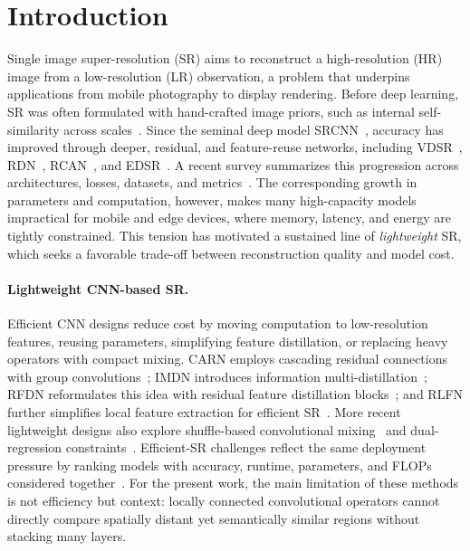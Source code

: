 \section{Introduction}
\label{sec:intro}

Single image super-resolution (SR) aims to reconstruct a high-resolution (HR)
image from a low-resolution (LR) observation, a problem that underpins applications
from mobile photography to display rendering. Before deep learning, SR was often
formulated with hand-crafted image priors, such as internal self-similarity
across scales~\cite{glasner2009single}. Since the seminal deep
model SRCNN~\cite{dong2014srcnn}, accuracy has improved through deeper,
residual, and feature-reuse networks, including
VDSR~\cite{kim2016vdsr}, RDN~\cite{zhang2018rdn}, RCAN~\cite{zhang2018rcan},
and EDSR~\cite{lim2017edsr}. A recent survey summarizes this progression across
architectures, losses, datasets, and metrics~\cite{moser2023survey}. The
corresponding growth in parameters and computation, however, makes many
high-capacity models impractical for mobile and edge devices, where memory,
latency, and energy are tightly constrained. This tension has motivated a sustained
line of \emph{lightweight} SR, which seeks a favorable
trade-off between reconstruction quality and model cost.

\paragraph{Lightweight CNN-based SR.}
Efficient CNN designs reduce cost by moving computation to low-resolution
features, reusing parameters, simplifying feature distillation, or replacing
heavy operators with compact mixing. CARN employs cascading
residual connections with group convolutions~\cite{ahn2018carn}; IMDN introduces
information multi-distillation~\cite{hui2019imdn}; RFDN reformulates this idea
with residual feature distillation blocks~\cite{liu2020rfdn}; and RLFN further
simplifies local feature extraction for efficient SR~\cite{kong2022rlfn}. More
recent lightweight designs also explore shuffle-based convolutional
mixing~\cite{sun2022shufflemixer} and dual-regression
constraints~\cite{guo2022dualregression}.
Efficient-SR challenges reflect the same deployment pressure by ranking models
with accuracy, runtime, parameters, and FLOPs considered together~\cite{ren2024ntire}.
For the present work, the main limitation of these methods is not efficiency but
context: locally connected convolutional operators cannot directly compare spatially
distant yet semantically similar regions without stacking many layers.


